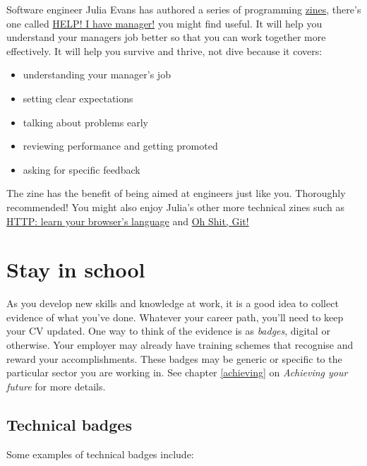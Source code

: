 \documentclass[
]{book}
\providecommand{\tightlist}{%
  \setlength{\itemsep}{0pt}\setlength{\parskip}{0pt}}
\begin{document}
Software engineer Julia Evans has authored a series of programming \href{https://en.wikipedia.org/wiki/Zine}{zines}, there's one called \href{https://wizardzines.com/zines/manager/}{HELP! I have manager!} \citep{helpihaveamanager} you might find useful. It will help you understand your managers job better so that you can work together more effectively. It will help you survive and thrive, not dive because it covers:

\begin{itemize}
\tightlist
\item
  understanding your manager's job
\item
  setting clear expectations
\item
  talking about problems early
\item
  reviewing performance and getting promoted
\item
  asking for specific feedback
\end{itemize}

The zine has the benefit of being aimed at engineers just like you. Thoroughly recommended! You might also enjoy Julia's other more technical zines such as \href{https://wizardzines.com/zines/http/}{HTTP: learn your browser's language} \citep{browserslanguage} and \href{https://wizardzines.com/zines/oh-shit-git/}{Oh Shit, Git!} \citep{ohshitgit}

\hypertarget{neverstoplearning}{%
\section{Stay in school}\label{neverstoplearning}}

As you develop new skills and knowledge at work, it is a good idea to collect evidence of what you've done. Whatever your career path, you'll need to keep your CV updated. One way to think of the evidence is as \emph{badges}, digital or otherwise. Your employer may already have training schemes that recognise and reward your accomplishments. These badges may be generic or specific to the particular sector you are working in. See chapter \ref{achieving} on \emph{Achieving your future} for more details.

\hypertarget{techie}{%
\subsection{Technical badges}\label{techie}}

Some examples of technical badges include:
\end{document}
